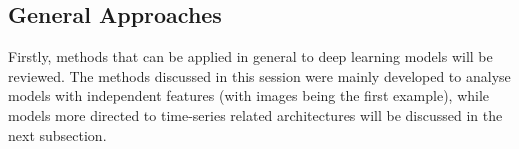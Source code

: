 \documentclass[../main.tex]{subfiles}
\begin{document}
    \subsection{General Approaches}

    Firstly, methods that can be applied in general to deep learning models will be reviewed. The methods discussed in this session were mainly developed to analyse models with independent features (with images being the first example), while models more directed to time-series related architectures will be discussed in the next subsection. \par

    
\end{document}
